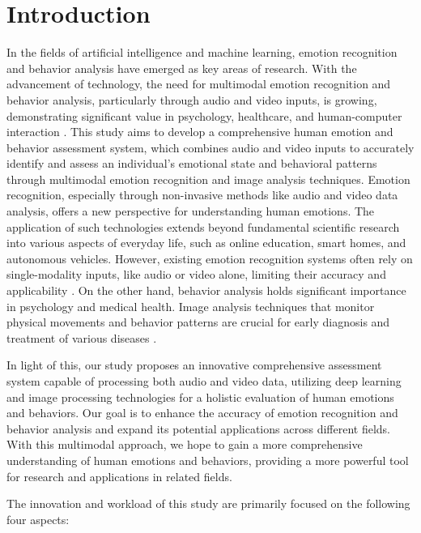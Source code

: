 \documentclass[preprint,12pt]{elsarticle}
\begin{document}

\section{Introduction}
\label{}
In the fields of artificial intelligence and machine learning, emotion recognition and behavior analysis have emerged as key areas of research. With the advancement of technology, the need for multimodal emotion recognition and behavior analysis, particularly through audio and video inputs, is growing, demonstrating significant value in psychology, healthcare, and human-computer interaction \cite{ref1}. This study aims to develop a comprehensive human emotion and behavior assessment system, which combines audio and video inputs to accurately identify and assess an individual's emotional state and behavioral patterns through multimodal emotion recognition and image analysis techniques. Emotion recognition, especially through non-invasive methods like audio and video data analysis, offers a new perspective for understanding human emotions. The application of such technologies extends beyond fundamental scientific research into various aspects of everyday life, such as online education, smart homes, and autonomous vehicles. However, existing emotion recognition systems often rely on single-modality inputs, like audio or video alone, limiting their accuracy and applicability \cite{ref2, ref3}. On the other hand, behavior analysis holds significant importance in psychology and medical health. Image analysis techniques that monitor physical movements and behavior patterns are crucial for early diagnosis and treatment of various diseases \cite{ref4, ref5, ref6}.

In light of this, our study proposes an innovative comprehensive assessment system capable of processing both audio and video data, utilizing deep learning and image processing technologies for a holistic evaluation of human emotions and behaviors. Our goal is to enhance the accuracy of emotion recognition and behavior analysis and expand its potential applications across different fields. With this multimodal approach, we hope to gain a more comprehensive understanding of human emotions and behaviors, providing a more powerful tool for research and applications in related fields.

The innovation and workload of this study are primarily focused on the following four aspects:
\end{document}
